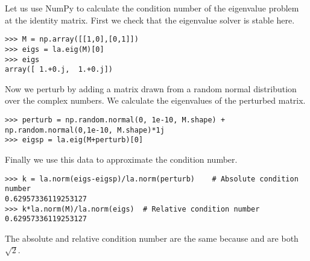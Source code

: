 Let us use NumPy to calculate the condition number of the eigenvalue problem at the identity matrix.
First we check that the eigenvalue solver is stable here.
\begin{lstlisting}
>>> M = np.array([[1,0],[0,1]])
>>> eigs = la.eig(M)[0]
>>> eigs
array([ 1.+0.j,  1.+0.j])
\end{lstlisting}
Now we perturb  by adding a matrix drawn from a random normal distribution over the complex numbers.
We calculate the eigenvalues of the perturbed matrix.
\begin{lstlisting}
>>> perturb = np.random.normal(0, 1e-10, M.shape) + np.random.normal(0,1e-10, M.shape)*1j
>>> eigsp = la.eig(M+perturb)[0]
\end{lstlisting}
Finally we use this data to approximate the condition number.
\begin{lstlisting}
>>> k = la.norm(eigs-eigsp)/la.norm(perturb)	# Absolute condition number
0.62957336119253127
>>> k*la.norm(M)/la.norm(eigs)	# Relative condition number
0.62957336119253127
\end{lstlisting}
The absolute and relative condition number are the same because  and  are both $\sqrt{2}$.


